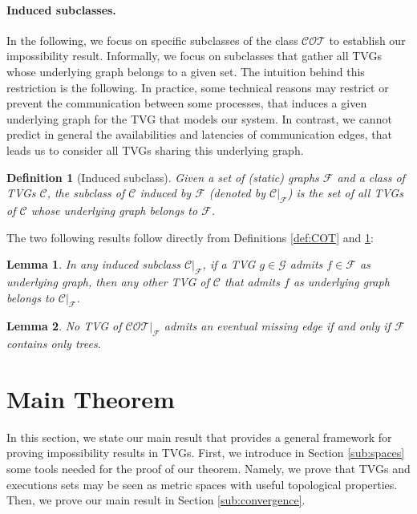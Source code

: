 \documentclass[11pt]{article}
\newtheorem{lemma}{Lemma}
\newtheorem{definition}{Definition}
\begin{document}
\paragraph{Induced subclasses.}

In the following, we focus on specific subclasses of the class $\mathcal{COT}$ to establish our impossibility result. Informally, we focus on subclasses that gather all TVGs whose underlying graph belongs to a given set. The intuition behind this restriction is the following. In practice, some technical reasons may restrict or prevent the communication between some processes, that induces a given underlying graph for the TVG that models our system. In contrast, we cannot predict in general the availabilities and latencies of communication edges, that leads us to consider all TVGs sharing this underlying graph.

\begin{definition}[Induced subclass]\label{def:inducedsubclass}
Given a set of (static) graphs $\mathcal{F}$ and a class of TVGs $\mathcal{C}$, the subclass of $\mathcal{C}$ induced by $\mathcal{F}$ (denoted by $\mathcal{C}|_\mathcal{F}$) is the set of all TVGs of $\mathcal{C}$ whose underlying graph belongs to $\mathcal{F}$.
\end{definition}

The two following results follow directly from Definitions \ref{def:COT} and \ref{def:inducedsubclass}:

\begin{lemma}\label{lem:lem5}
In any induced subclass $\mathcal{C}|_\mathcal{F}$, if a TVG $g\in\mathcal{G}$ admits $f\in\mathcal{F}$ as underlying graph, then any other TVG of $\mathcal{C}$ that admits $f$ as underlying graph belongs to $\mathcal{C}|_\mathcal{F}$.
\end{lemma}

\begin{lemma}\label{lem:lem6}
No TVG of $\mathcal{COT}|_\mathcal{F}$ admits an eventual missing edge if and only if $\mathcal{F}$ contains only  trees. 
\end{lemma}

\section{Main Theorem}\label{sec:main}

In this section, we state our main result that provides a general framework for proving impossibility results in TVGs. First, we introduce in Section \ref{sub:spaces} some tools needed for the proof of our theorem. Namely, we prove that TVGs and executions sets may be seen as metric spaces with useful topological properties. Then, we prove our main result in Section \ref{sub:convergence}.
\end{document}
